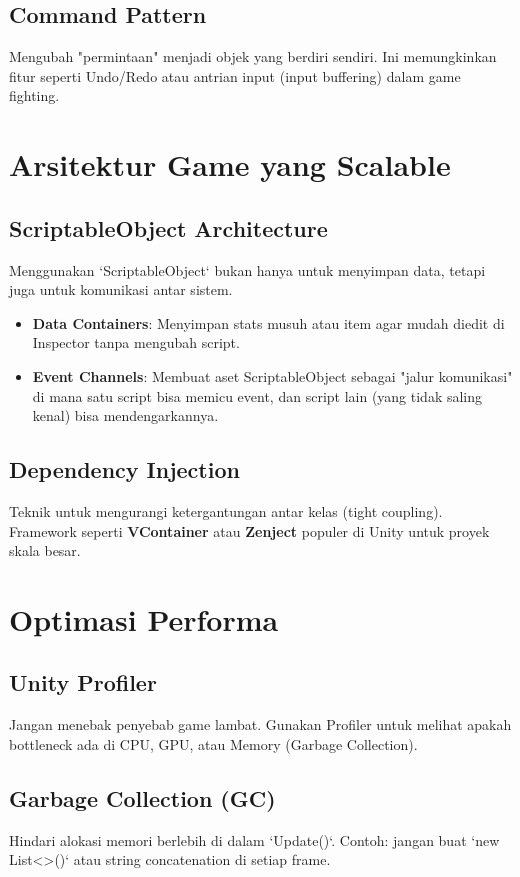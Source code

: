\subsection{Command Pattern}
Mengubah "permintaan" menjadi objek yang berdiri sendiri. Ini memungkinkan fitur seperti Undo/Redo atau antrian input (input buffering) dalam game fighting.

\section{Arsitektur Game yang Scalable}

\subsection{ScriptableObject Architecture}
Menggunakan `ScriptableObject` bukan hanya untuk menyimpan data, tetapi juga untuk komunikasi antar sistem.
\begin{itemize}
    \item \textbf{Data Containers}: Menyimpan stats musuh atau item agar mudah diedit di Inspector tanpa mengubah script.
    \item \textbf{Event Channels}: Membuat aset ScriptableObject sebagai "jalur komunikasi" di mana satu script bisa memicu event, dan script lain (yang tidak saling kenal) bisa mendengarkannya.
\end{itemize}

\subsection{Dependency Injection}
Teknik untuk mengurangi ketergantungan antar kelas (tight coupling). Framework seperti \textbf{VContainer} atau \textbf{Zenject} populer di Unity untuk proyek skala besar.

\section{Optimasi Performa}

\subsection{Unity Profiler}
Jangan menebak penyebab game lambat. Gunakan Profiler untuk melihat apakah bottleneck ada di CPU, GPU, atau Memory (Garbage Collection).

\subsection{Garbage Collection (GC)}
Hindari alokasi memori berlebih di dalam `Update()`. Contoh: jangan buat `new List<>()` atau string concatenation di setiap frame.

